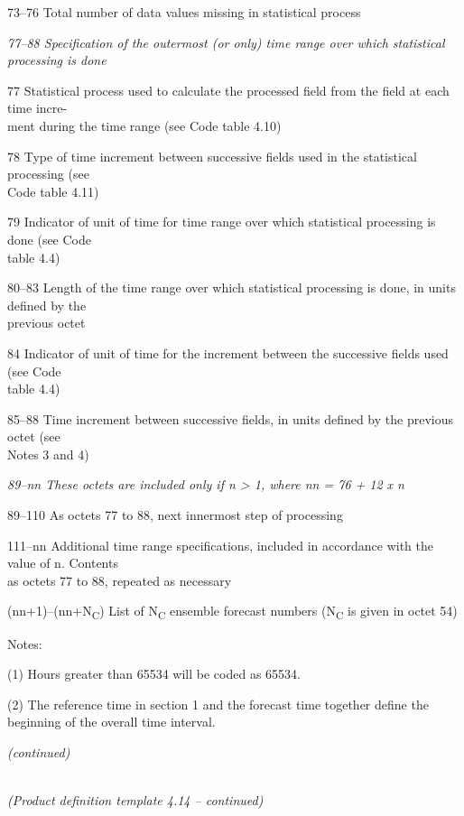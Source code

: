 73--76 Total number of data values missing in statistical process

\emph{77--88 Specification of the outermost (or only) time range over which statistical}\\
\emph{processing is done}

77 Statistical process used to calculate the processed field from the field at each time incre-\\
ment during the time range (see Code table 4.10)

78 Type of time increment between successive fields used in the statistical processing (see\\
Code table 4.11)

79 Indicator of unit of time for time range over which statistical processing is done (see Code\\
table 4.4)

80--83 Length of the time range over which statistical processing is done, in units defined by the\\
previous octet

84 Indicator of unit of time for the increment between the successive fields used (see Code\\
table 4.4)

85--88 Time increment between successive fields, in units defined by the previous octet (see\\
Notes 3 and 4)

\emph{89--nn These octets are included only if n \textgreater{} 1, where nn = 76 + 12 x n}

89--110 As octets 77 to 88, next innermost step of processing

111--nn Additional time range specifications, included in accordance with the value of n. Contents\\
as octets 77 to 88, repeated as necessary

(nn+1)--(nn+N\textsubscript{C}) List of N\textsubscript{C} ensemble forecast numbers (N\textsubscript{C} is given in octet 54)

Notes:

(1) Hours greater than 65534 will be coded as 65534.

(2) The reference time in section 1 and the forecast time together define the beginning of the overall time interval.

\emph{(continued)}

\emph{\\
(Product definition template 4.14 -- continued)}

